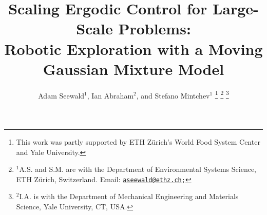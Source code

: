 \documentclass[letterpaper,10pt,conference,twoside]{IEEEtran}
\theoremstyle{definition}
\begin{document}

\title{\LARGE\bf Scaling Ergodic Control for Large-Scale Problems:\\Robotic Exploration with a Moving Gaussian Mixture Model}

\author{Adam Seewald${}^{\text{1}}$, Ian Abraham${}^{\text{2}}$, and Stefano Mintchev${}^{\text{1}}$
  \thanks{This work was partly supported by ETH Z{\"u}rich's World Food System Center and Yale University.}
  \thanks{${}^{\text{1}}$A.\hspace*{.4ex}S. and S.\hspace*{.4ex}M. are with the Department of Environmental Systems Science, ETH Z{\"u}rich, Switzerland. Email: {\tt\footnotesize \href{mailto:aseewald@ethz.ch}{aseewald@ethz.ch};}}
  \thanks{${}^{\text{2}}$I.\hspace*{.4ex}A. is with the Department of Mechanical Engineering and Materials Science, Yale University, CT, USA.}
}

\maketitle

\vspace*{-.5cm}
\begin{abstract}
\end{abstract}



\end{document}
